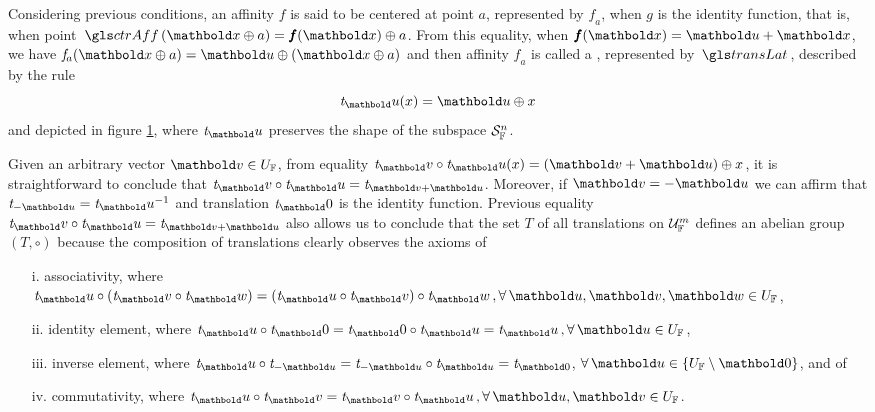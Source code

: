 Considering previous conditions, an affinity $\mathit{f}$ is said to be centered at point $a$, represented by $\mathit{f}_a$, when $\mathit{g}$ is the identity function, that is, when point $\fua{\gloref{ctrAff}}{\vto{x}\oplus a}=\fua{\vtf{f}}{\vto{x}}\oplus a$. From this equality, when $\fua{\vtf{f}}{\vto{x}}=\vto{u}+\vto{x}$, we have $\fua{\mathit{f}_a}{\vto{x}\oplus a}=\vto{u}\oplus(\vto{x}\oplus a)$ and then affinity $\mathit{f}_a$ is called a , represented by $\gloref{transLat}$, described by the rule
\begin{equation}\label{eq:translt}
\fua{\mathit{t}_\vto{u}}{x}=\vto{u}\oplus x
\end{equation}
and depicted in figure \ref{fg:translat}, where $\mathit{t}_\vto{u}$ preserves the shape of the subspace $\eamd{S}{F}{n}$.
\begin{figure}[!ht]
\centering
\begin{center}
\scalebox{.72}{}
\end{center}
\label{fg:translat}
\end{figure}
Given an arbitrary vector $\vto{v}\in U_\cam{F}$, from equality $\fua{\mathit{t}_\vto{v}\circ\mathit{t}_\vto{u}}{x}=(\vto{v}+\vto{u})\oplus x$,
it is straightforward to conclude that $\mathit{t}_\vto{v}\circ\mathit{t}_\vto{u}=\mathit{t}_{\vto{v}+\vto{u}}$. Moreover, if $\vto{v}=-\vto{u}$ we can affirm that $\mathit{t}_{-\vto{u}}=\mathit{t}_\vto{u}^{-1}$ and translation $\mathit{t}_\vto{0}$ is the identity function. Previous equality $\mathit{t}_\vto{v}\circ\mathit{t}_\vto{u}=\mathit{t}_{\vto{v}+\vto{u}}$ also allows us to conclude that the set $\mathit{T}$ of all translations on $\eamd{U}{F}{m}$ defines an abelian group $(\mathit{T},\circ)$ because the composition of translations clearly observes the axioms of
\begin{itemize}
\setlength\itemsep{.1em}
\item[i.] associativity, where $\mathit{t}_\vto{u}\circ\lpa \mathit{t}_\vto{v} \circ \mathit{t}_\vto{w} \rpa =
\lpa\mathit{t}_\vto{u}\circ \mathit{t}_\vto{v} \rpa\circ \mathit{t}_\vto{w} \, , \forall \, \vto{u},\vto{v},\vto{w}\in U_\cam{F}$,
\item[ii.] identity element, where $\mathit{t}_\vto{u}\circ\mathit{t}_\vto{0}=\mathit{t}_\vto{0}\circ\mathit{t}_\vto{u}=\mathit{t}_\vto{u}\,,\forall \, \vto{u} \in U_\cam{F}$,
\item[iii.] inverse element, where
$\mathit{t}_\vto{u} \circ  \mathit{t}_{-\vto{u}}= \mathit{t}_{-\vto{u}} \circ \mathit{t}_{\vto{u}} = \mathit{t}_{\vto{0}}$, $\forall \, \vto{u} \in \{U_\cam{F}\setminus\vto{0}\}$, and of
\item[iv.] commutativity, where $\mathit{t}_\vto{u}\circ \mathit{t}_\vto{v}= \mathit{t}_\vto{v}\circ \mathit{t}_\vto{u}\,,\forall \, \vto{u},\vto{v} \in U_\cam{F}$.
\end{itemize}


